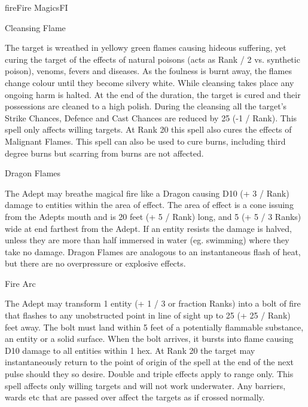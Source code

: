 \begin{College}[2.0]{fire}{Fire Magics}{FI}
\begin{spell}[S-1]{Cleansing Flame}
\begin{effects}
The target is wreathed in yellowy green flames causing hideous
suffering, yet curing the target of the effects of natural poisons
(acts as Rank / 2 vs. synthetic poison), venoms, fevers and
diseases. As the foulness is burnt away, the flames change colour
until they become silvery white.  While cleansing takes place any
ongoing harm is halted.  At the end of the duration, the target is
cured and their possessions are cleaned to a high polish.  During the
cleansing all the target’s Strike Chances, Defence and Cast Chances
are reduced by 25 (-1 / Rank).  This spell only affects willing
targets. At Rank 20 this spell also cures the effects of Malignant
Flames. This spell can also be used to cure burns, including third
degree burns but scarring from burns are not affected.
\end{effects}
\end{spell}


\begin{spell}[S-2]{Dragon Flames}
\begin{effects}
The Adept may breathe magical fire like a Dragon causing D10 (+ 3 /
Rank) damage to entities within the area of effect. The area of effect
is a cone issuing from the Adepts mouth and is 20 feet (+ 5 / Rank)
long, and 5 (+ 5 / 3 Ranks) wide at end farthest from the Adept. If an
entity resists the damage is halved, unless they are more than half
immersed in water (eg. swimming) where they take no damage.  Dragon
Flames are analogous to an instantaneous flash of heat, but there are
no overpressure or explosive effects.
\end{effects}
\end{spell}

\begin{spell}[S-3]{Fire Arc}

\begin{effects}
The Adept may transform 1 entity (+ 1 / 3 or fraction Ranks) into a
bolt of fire that flashes to any unobstructed point in line of sight
up to 25 (+ 25 / Rank) feet away. The bolt must land within 5 feet of
a potentially flammable substance, an entity or a solid surface.  When
the bolt arrives, it bursts into flame causing D10 damage to all
entities within 1 hex.  At Rank 20 the target may instantaneously
return to the point of origin of the spell at the end of the next
pulse should they so desire.  Double and triple effects apply to range
only. This spell affects only willing targets and will not work
underwater. Any barriers, wards etc that are passed over affect the
targets as if crossed normally.
\end{effects}
\end{spell}


\end{College}
